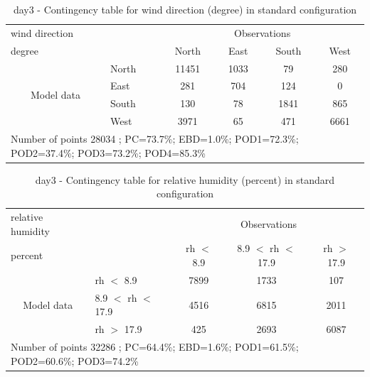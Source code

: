 \begin{table}[p!]
\begin{center}
\begin{tabular}{llcccc}
\hline
{wind direction}                                       &                             &    \multicolumn{4}{c}{Observations}                 \\
{degree}                                       &                             & {North}   & {East} & {South} & {West} \\
\hline
\multicolumn{1}{c}{\multirow{4}{*}{Model data}}  & {North}                    & 11451   & 1033    & 79     & 280\\
                                                 & {East}                     & 281   & 704    & 124     & 0\\
                                                 & {South}                    & 130   & 78   & 1841    & 865\\
                                                 & {West}                     & 3971  & 65   & 471    & 6661\\
\hline 
\multicolumn{6}{l}{ Number of points        28034 ; PC=73.7\%; EBD=1.0\%; POD1=72.3\%; POD2=37.4\%; POD3=73.2\%; POD4=85.3\%}                 \\
\end{tabular}
\end{center}
\caption{day3 - Contingency table for {wind direction} (degree) in standard configuration}
\label{tab:contingencywdBEF:day3}
\end{table}
\begin{table}[p!]
\begin{center}
\begin{tabular}{llccc}
\hline
{relative humidity}                                       &                                                    & \multicolumn{3}{c}{Observations}                 \\
{percent}                                       &                             & rh $<$ 8.9   & 8.9 $<$ rh $<$ 17.9 & rh $>$ 17.9 \\
\hline
\multicolumn{1}{c}{\multirow{3}{*}{Model data}}  & rh $<$ 8.9             & 7899                & 1733                       & 107              \\
                                                 & 8.9  $<$ rh $<$ 17.9 & 4516                & 6815                       & 2011              \\
                                                 & rh $>$ 17.9             & 425                & 2693                       & 6087              \\
\hline
\multicolumn{5}{l}{ Number of points        32286 ; PC=64.4\%; EBD=1.6\%; POD1=61.5\%; POD2=60.6\%; POD3=74.2\%}
\end{tabular}
\end{center}
\caption{day3 - Contingency table for  relative humidity (percent) in standard configuration}
\label{tab:contingencyrhBEF:day3}
\end{table}
